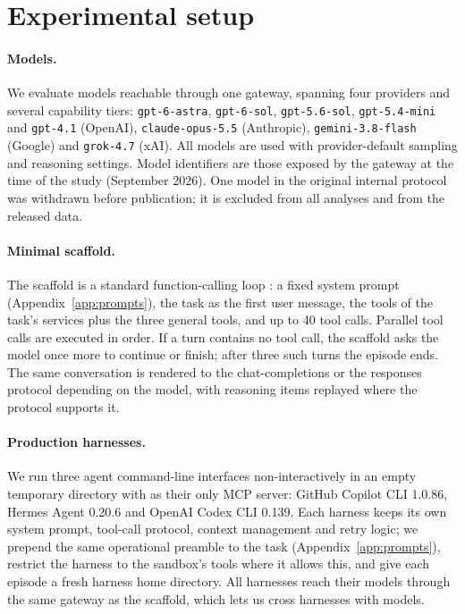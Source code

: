 \section{Experimental setup}
\label{sec:setup}

\paragraph{Models.} We evaluate \NModels{} models reachable through one gateway, spanning four providers and
several capability tiers: \texttt{gpt-6-astra}, \texttt{gpt-6-sol}, \texttt{gpt-5.6-sol}, \texttt{gpt-5.4-mini}
and \texttt{gpt-4.1} (OpenAI), \texttt{claude-opus-5.5} (Anthropic), \texttt{gemini-3.8-flash} (Google) and
\texttt{grok-4.7} (xAI). All models are used with provider-default
sampling and reasoning settings. Model identifiers are those exposed by the gateway at the time of the study
(September 2026). One model in the original internal protocol was withdrawn before publication; it is excluded from all analyses and
from the released data.

\paragraph{Minimal scaffold.} The scaffold is a standard function-calling loop \citep{yao2023react}: a fixed
system prompt (Appendix~\ref{app:prompts}), the task as the first user message, the tools of the task's
services plus the three general tools, and up to 40 tool calls. Parallel tool calls are executed in order.
If a turn contains no tool call, the scaffold asks the model once more to continue or finish; after three
such turns the episode ends. The same conversation is rendered to the chat-completions or the responses
protocol depending on the model, with reasoning items replayed where the protocol supports it.

\paragraph{Production harnesses.} We run three agent command-line interfaces non-interactively in an empty
temporary directory with \bench{} as their only MCP server: GitHub Copilot CLI 1.0.86, Hermes Agent 0.20.6 and
OpenAI Codex CLI 0.139. Each harness keeps its own system prompt, tool-call protocol, context management and
retry logic; we prepend the same operational preamble to the task (Appendix~\ref{app:prompts}), restrict the
harness to the sandbox's tools where it allows this, and give each episode a fresh harness home directory.
All harnesses reach their models through the same gateway as the scaffold, which lets us cross harnesses with
models.

